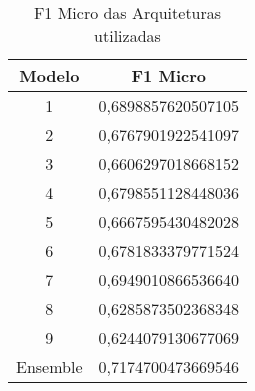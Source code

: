 \begin{table}[!htb]
\centering
\caption{F1 Micro das Arquiteturas utilizadas}
\label{tbl:fscore}
\begin{tabular}{@{}cc@{}}
\toprule
Modelo & F1 Micro           \\ \midrule
1      & 0,6898857620507105 \\
2      & 0,6767901922541097 \\
3      & 0,6606297018668152 \\
4      & 0,6798551128448036 \\
5      & 0,6667595430482028 \\
6      & 0,6781833379771524 \\
7      & 0,6949010866536640 \\
8      & 0,6285873502368348 \\
9      & 0,6244079130677069 \\
\toprule
Ensemble & 0,7174700473669546 \\ \bottomrule
\end{tabular}
\end{table}
